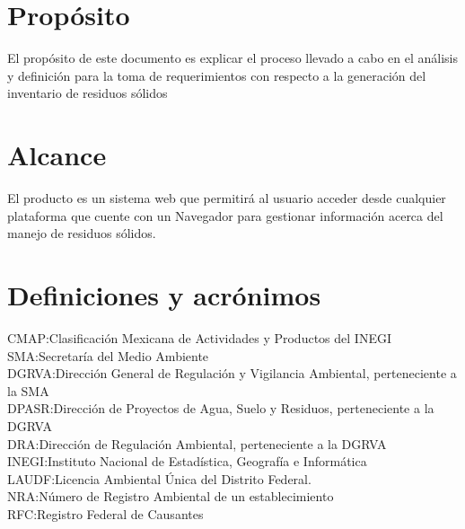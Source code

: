 \section{Propósito}

El propósito de este documento es explicar el proceso llevado a cabo en el análisis y definición para la toma de requerimientos con respecto a la generación del inventario de residuos  sólidos
\section{Alcance}
El producto es un sistema web que permitirá al usuario acceder desde cualquier plataforma que cuente con un Navegador para gestionar información acerca del manejo de residuos sólidos.


\section{Definiciones y acrónimos}
\textbullet CMAP:Clasificación Mexicana de Actividades  y Productos del INEGI\\

\textbullet SMA:Secretaría del Medio Ambiente\\

\textbullet DGRVA:Dirección General de Regulación y Vigilancia Ambiental, perteneciente a la SMA\\

\textbullet DPASR:Dirección de Proyectos de Agua, Suelo y Residuos, perteneciente a la DGRVA\\

\textbullet DRA:Dirección de Regulación Ambiental, perteneciente a la DGRVA\\

\textbullet INEGI:Instituto Nacional de Estadística, Geografía e Informática\\

\textbullet LAUDF:Licencia Ambiental Única del Distrito Federal.\\

\textbullet NRA:Número de Registro Ambiental de un establecimiento\\

\textbullet RFC:Registro Federal de Causantes\\

